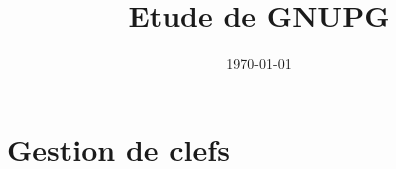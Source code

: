 \documentclass{../res/univ-projet}
\title{Etude de GNUPG}
\author{}
\date{\today}
\begin{document}
 

\maketitle
\newpage
\tableofcontents
\newpage


\section{Gestion de clefs}
  
  
  
  
\end{document}

